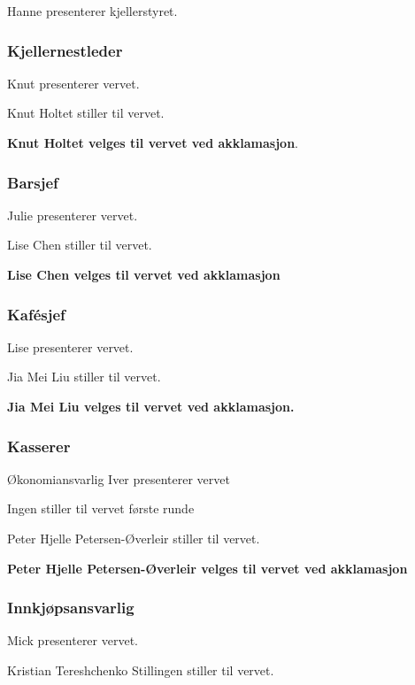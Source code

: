 \documentclass[10pt,norsk,a4paper,usenames,dvipsnames]{article}
\begin{document}
\begin{multicols}{2}
        Hanne presenterer kjellerstyret.

        
        \subsubsection{Kjellernestleder}
        Knut presenterer vervet.

        Knut Holtet stiller til vervet.

        \textbf{Knut Holtet velges til vervet ved akklamasjon}.

        
        \subsubsection{Barsjef}

        Julie presenterer vervet. 

        Lise Chen stiller til vervet.

        \textbf{Lise Chen velges til vervet ved akklamasjon}        
        
        \subsubsection{Kafésjef}
            
        Lise presenterer vervet.

        Jia Mei Liu stiller til vervet. 

        \textbf{Jia Mei Liu velges til vervet ved akklamasjon.}
        
        \subsubsection{Kasserer}

        Økonomiansvarlig Iver presenterer vervet

        Ingen stiller til vervet første runde

        Peter Hjelle Petersen-Øverleir stiller til vervet.

        \textbf{Peter Hjelle Petersen-Øverleir velges til vervet ved akklamasjon}
        
        \subsubsection{Innkjøpsansvarlig}
        Mick presenterer vervet. 

        Kristian Tereshchenko Stillingen stiller til vervet.


\end{multicols}
\end{document}
